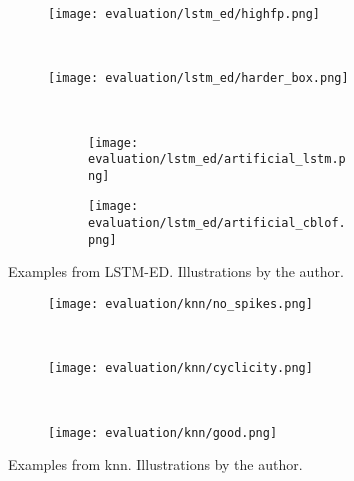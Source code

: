 \begin{figure}[htp!]
    \begin{subfigure}[b]{\linewidth}
        \centering
        \texttt{[image: evaluation/lstm\_ed/highfp.png]}
        \label{fig:lstmed-fp}
    \end{subfigure}%
    \\
    \begin{subfigure}[b]{\linewidth}
        \centering
        \texttt{[image: evaluation/lstm\_ed/harder\_box.png]}
        \label{fig:lstmed-harder}
    \end{subfigure}
    \\
    \begin{subfigure}[b]{\linewidth}
        \begin{subfigure}[b]{.45\linewidth}
            \centering
            \texttt{[image: evaluation/lstm\_ed/artificial\_lstm.png]}
        \end{subfigure}
        \hfill
        \begin{subfigure}[b]{.45\linewidth}
            \centering
            \texttt{[image: evaluation/lstm\_ed/artificial\_cblof.png]}
        \end{subfigure}
        \label{fig:lstmed-artificial}
    \end{subfigure}
\caption[Examples from LSTM-ED.]{Examples from LSTM-ED\@. Illustrations by the author.}\label{fig:lstmed-output}
\end{figure}

\begin{figure}[htp!]
    \begin{subfigure}[b]{\linewidth}
        \centering
        \texttt{[image: evaluation/knn/no\_spikes.png]}
        \label{fig:spike-missed}
    \end{subfigure}
    \\
    \begin{subfigure}[b]{\linewidth}
        \centering
        \texttt{[image: evaluation/knn/cyclicity.png]}
        \label{fig:knn-cyclicity}
    \end{subfigure}%
    \\
    \begin{subfigure}[b]{\linewidth}
        \centering
        \texttt{[image: evaluation/knn/good.png]}
        \label{fig:knn-harder}
    \end{subfigure}
\caption[Examples from \gls{knn}.]{Examples from \gls{knn}. Illustrations by the author.}\label{fig:knn-output}
\end{figure}


